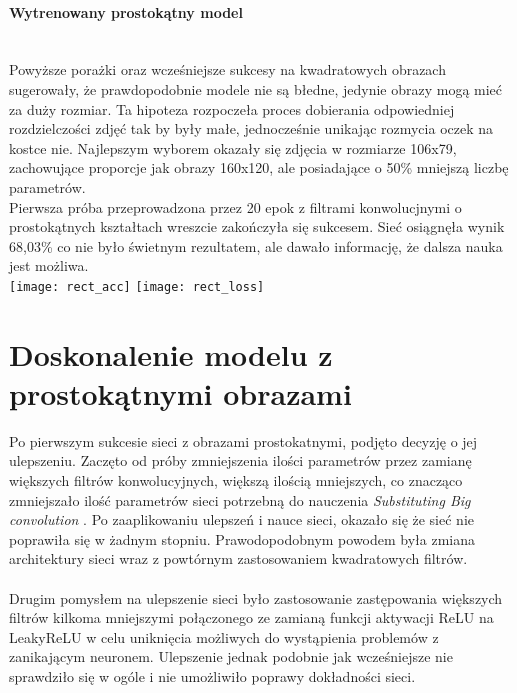 \paragraph{Wytrenowany prostokątny model} \mbox{}\\
Powyższe porażki oraz wcześniejsze sukcesy na kwadratowych obrazach sugerowały, że
prawdopodobnie modele nie są błedne, jedynie obrazy mogą mieć za duży rozmiar. Ta hipoteza
rozpoczeła proces dobierania odpowiedniej rozdzielczości zdjęć tak by były małe, jednocześnie
unikając rozmycia oczek na kostce nie. Najlepszym wyborem okazały się zdjęcia w rozmiarze 106x79,
zachowujące proporcje jak obrazy 160x120, ale posiadające o 50\% mniejszą liczbę parametrów.\\
Pierwsza próba przeprowadzona przez 20 epok z filtrami konwolucjnymi o prostokątnych
kształtach wreszcie zakończyła się sukcesem. Sieć osiągnęła wynik 68,03\% co nie
było świetnym rezultatem, ale dawało informację, że dalsza nauka jest możliwa.\\
\texttt{[image: rect\_acc]}
\texttt{[image: rect\_loss]}

\section{Doskonalenie modelu z prostokątnymi obrazami}
Po pierwszym sukcesie sieci z obrazami prostokatnymi, podjęto decyzję o jej ulepszeniu.
Zaczęto od próby zmniejszenia ilości parametrów przez zamianę większych filtrów konwolucyjnych,
większą ilością mniejszych, co znacząco zmniejszało ilość parametrów sieci potrzebną do nauczenia
\textit{Substituting Big convolution} \cite{substBigConv}.
Po zaaplikowaniu ulepszeń i nauce sieci, okazało się że sieć nie poprawiła się w żadnym
stopniu. Prawodopodobnym powodem była zmiana architektury sieci wraz z powtórnym
zastosowaniem kwadratowych filtrów.\\\\
Drugim pomysłem na ulepszenie sieci było zastosowanie zastępowania większych filtrów
kilkoma mniejszymi połączonego ze zamianą funkcji aktywacji ReLU na LeakyReLU w celu uniknięcia
możliwych do wystąpienia problemów z zanikającym neuronem. Ulepszenie jednak podobnie
jak wcześniejsze nie sprawdziło się w ogóle i nie umożliwiło poprawy dokładności sieci.

